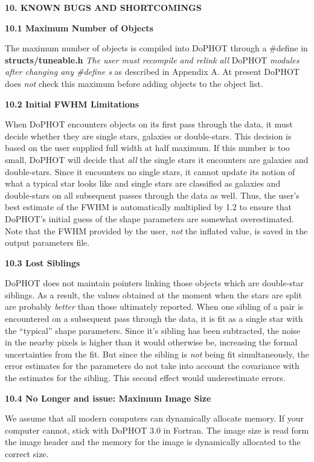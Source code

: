 \centerline{\bf 10. KNOWN BUGS AND SHORTCOMINGS}

\centerline{\bf 10.1 Maximum Number of Objects}

The maximum number of objects is compiled into DoPHOT through a
\#define in {\bf structs/tuneable.h} 
{\it The user must recompile and relink all} 
DoPHOT {\it modules after changing any \#define s} 
as described in Appendix A.  
At present DoPHOT does {\it not} check this
maximum before adding objects to the object list.

\centerline{\bf 10.2 Initial FWHM Limitations}

When DoPHOT encounters objects on its first pass through the
data, it must decide whether they are single stars, galaxies
or double-stars.  This decision is based on the user
supplied full width at half maximum.  If this number is too
small, DoPHOT will decide that {\it all} the single stars it
encounters are galaxies and double-stars.  Since it
encounters no single stars, it cannot update its notion of
what a typical star looks like and single stars are
classified as galaxies and double-stars on all subsequent
passes through the data as well.  Thus, the user's best estimate of
the FWHM is automatically multiplied by 1.2 to ensure that 
DoPHOT's initial guess of the shape parameters are somewhat 
overestimated.  Note that the FWHM provided by the user, 
{\it not} the inflated value, is saved in the output parameters file.

\centerline{\bf 10.3 Lost Siblings}

DoPHOT does not maintain pointers linking those objects
which are double-star siblings.  As a result, the values
obtained at the moment when the stars are split are probably
{\it better} than those ultimately reported.  When one
sibling of a pair is encountered on a subsequent pass
through the data, it is fit as a single star with the
``typical'' shape parameters.  Since it's sibling has been
subtracted, the noise in the nearby pixels is higher than it
would otherwise be, increasing the formal uncertainties from
the fit.  But since the sibling is {\it not} being fit
simultaneously, the error estimates for the parameters do
not take into account the covariance with the estimates for
the sibling.  This second effect would underestimate errors.

\centerline{\bf 10.4 No Longer and issue: Maximum Image Size}

We assume that all modern computers can dynamically allocate 
memory.  If your computer cannot, stick with DoPHOT 3.0 in Fortran.  
The image size is read form the image header and the memory for 
the image is dynamically allocated to the correct size.

